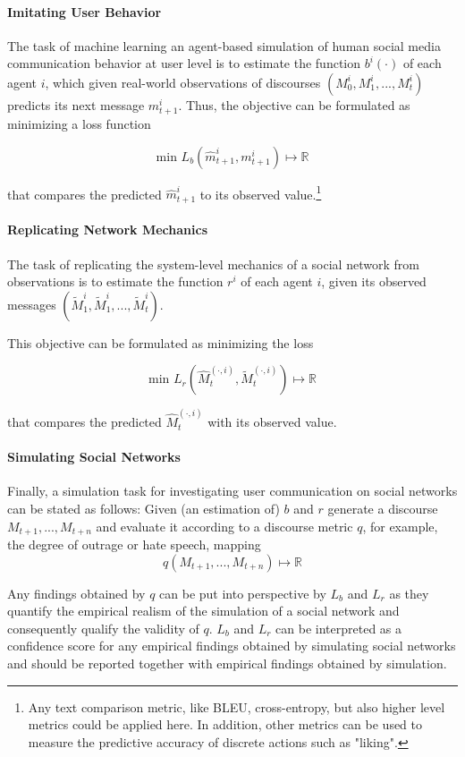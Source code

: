 

\paragraph{Imitating User Behavior}
\label{subsec:replicatingUsers}
The task of machine learning an agent-based simulation of human social media communication behavior at user level is to estimate the function $b^i(\cdot)$ of each agent $i$, which given real-world observations of discourses $(M_0^i, M_1^i,... , M_t^i)$ predicts its next message $m_{t+1}^i$. Thus, the objective can be formulated as minimizing a loss function 

$$\textrm{min\ } L_{b}(\widehat{m}_{t+1}^i, m_{t+1}^i) \mapsto \mathbb{R}$$

that compares the predicted $\widehat{m}_{t+1}^i$ to its observed value.\footnote{Any text comparison metric, like BLEU, cross-entropy, but also higher level metrics could be applied here. In addition, other metrics can be used to measure the predictive accuracy of discrete actions such as "liking".}

\paragraph{Replicating Network Mechanics}
\label{subsec:replicatingMechanics}
The task of replicating the system-level mechanics of a social network from observations is to estimate the function $r^i$ of each agent $i$, given its observed messages $(\widetilde{M}_1^i, \widetilde{M}_1^i,... , \widetilde{M}_t^i)$.

This objective can be formulated as minimizing the loss 

$$\textrm{min\ } L_{r}(\widehat{M}_t^{(\cdot, i)}, \widetilde{M}_t^{(\cdot, i)}) \mapsto \mathbb{R}$$

that compares the predicted $\widehat{M}_t^{(\cdot, i)}$ with its observed value.

\paragraph{Simulating Social Networks}
\label{subsec:simulation}
Finally, a simulation task for investigating user communication on social networks can be stated as follows: Given (an estimation of) $b$ and $r$ generate a discourse $M_{t+1}, ..., M_{t+n}$ and evaluate it according to a discourse metric $q$, for example, the degree of outrage or hate speech, mapping 
$$q(M_{t+1}, ..., M_{t+n}) \mapsto \mathbb{R}$$

Any findings obtained by $q$ can be put into perspective by $L_{b}$ and $L_{r}$ as they quantify the empirical realism of the simulation of a social network and consequently qualify the validity of $q$. $L_{b}$ and $L_{r}$ can be interpreted as a confidence score for any empirical findings obtained by simulating social networks and should be reported together with empirical findings obtained by simulation.

